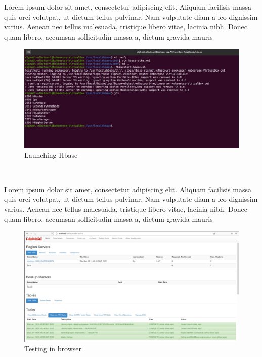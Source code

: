 \begin{spacing}{1.2}
\par Lorem ipsum dolor sit amet, consectetur adipiscing elit. Aliquam facilisis massa quis orci volutpat, ut dictum tellus pulvinar. Nam vulputate diam a leo dignissim varius. Aenean nec tellus malesuada, tristique libero vitae, lacinia nibh. Donec quam libero, accumsan sollicitudin massa a, dictum gravida mauris
\\
\begin{figure}[!htb] 
\begin{center} 
\includegraphics[width=1\linewidth]{Pictures/HBase/Configuring Hbase in Standalone & Pseudo-distributed mode/Configuring Hbase in Pseudo-distributed mode/Launching Hbase} 
\end{center} 
\caption{Launching Hbase} 
\end{figure}  \FloatBarrier
\\

\par Lorem ipsum dolor sit amet, consectetur adipiscing elit. Aliquam facilisis massa quis orci volutpat, ut dictum tellus pulvinar. Nam vulputate diam a leo dignissim varius. Aenean nec tellus malesuada, tristique libero vitae, lacinia nibh. Donec quam libero, accumsan sollicitudin massa a, dictum gravida mauris
\\
\begin{figure}[!htb] 
\begin{center} 
\includegraphics[width=1\linewidth]{Pictures/HBase/Configuring Hbase in Standalone & Pseudo-distributed mode/Configuring Hbase in Pseudo-distributed mode/Testing in browser} 
\end{center} 
\caption{Testing in browser} 
\end{figure}  \FloatBarrier
\\


\end{spacing}
